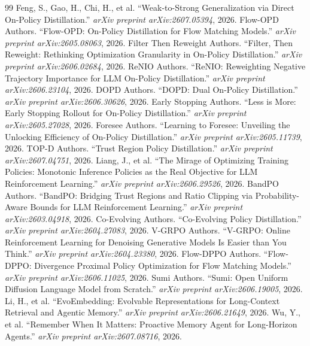 \documentclass[11pt,a4paper]{article}
\begin{document}
\begin{thebibliography}{99}
 Feng, S., Gao, H., Chi, H., et al. ``Weak-to-Strong Generalization via Direct On-Policy Distillation.'' \emph{arXiv preprint arXiv:2607.05394}, 2026.
 Flow-OPD Authors. ``Flow-OPD: On-Policy Distillation for Flow Matching Models.'' \emph{arXiv preprint arXiv:2605.08063}, 2026.
 Filter Then Reweight Authors. ``Filter, Then Reweight: Rethinking Optimization Granularity in On-Policy Distillation.'' \emph{arXiv preprint arXiv:2606.02684}, 2026.
 ReNIO Authors. ``ReNIO: Reweighting Negative Trajectory Importance for LLM On-Policy Distillation.'' \emph{arXiv preprint arXiv:2606.23104}, 2026.
 DOPD Authors. ``DOPD: Dual On-Policy Distillation.'' \emph{arXiv preprint arXiv:2606.30626}, 2026.
 Early Stopping Authors. ``Less is More: Early Stopping Rollout for On-Policy Distillation.'' \emph{arXiv preprint arXiv:2605.27028}, 2026.
 Foresee Authors. ``Learning to Foresee: Unveiling the Unlocking Efficiency of On-Policy Distillation.'' \emph{arXiv preprint arXiv:2605.11739}, 2026.
 TOP-D Authors. ``Trust Region Policy Distillation.'' \emph{arXiv preprint arXiv:2607.04751}, 2026.
 Liang, J., et al. ``The Mirage of Optimizing Training Policies: Monotonic Inference Policies as the Real Objective for LLM Reinforcement Learning.'' \emph{arXiv preprint arXiv:2606.29526}, 2026.
 BandPO Authors. ``BandPO: Bridging Trust Regions and Ratio Clipping via Probability-Aware Bounds for LLM Reinforcement Learning.'' \emph{arXiv preprint arXiv:2603.04918}, 2026.
 Co-Evolving Authors. ``Co-Evolving Policy Distillation.'' \emph{arXiv preprint arXiv:2604.27083}, 2026.
 V-GRPO Authors. ``V-GRPO: Online Reinforcement Learning for Denoising Generative Models Is Easier than You Think.'' \emph{arXiv preprint arXiv:2604.23380}, 2026.
 Flow-DPPO Authors. ``Flow-DPPO: Divergence Proximal Policy Optimization for Flow Matching Models.'' \emph{arXiv preprint arXiv:2606.11025}, 2026.
 Sumi Authors. ``Sumi: Open Uniform Diffusion Language Model from Scratch.'' \emph{arXiv preprint arXiv:2606.19005}, 2026.
 Li, H., et al. ``EvoEmbedding: Evolvable Representations for Long-Context Retrieval and Agentic Memory.'' \emph{arXiv preprint arXiv:2606.21649}, 2026.
 Wu, Y., et al. ``Remember When It Matters: Proactive Memory Agent for Long-Horizon Agents.'' \emph{arXiv preprint arXiv:2607.08716}, 2026.
\end{thebibliography}
\end{document}
